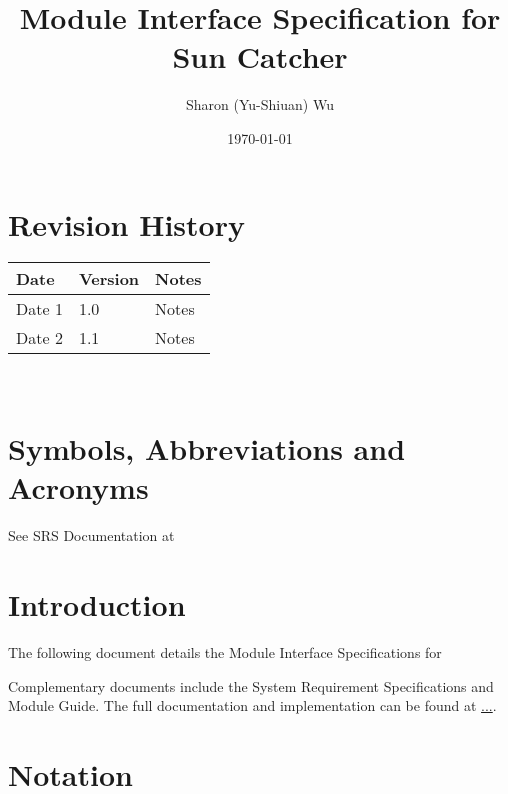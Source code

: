 \documentclass[12pt, titlepage]{article}
\newcommand{\progname}{Sun Catcher}
\begin{document}
\title{Module Interface Specification for \progname}

\author{Sharon (Yu-Shiuan) Wu}

\date{\today}

\maketitle


\section{Revision History}

\begin{tabularx}{\textwidth}{p{3cm}p{2cm}X}
\toprule {\bf Date} & {\bf Version} & {\bf Notes}\\
\midrule
Date 1 & 1.0 & Notes\\
Date 2 & 1.1 & Notes\\
\bottomrule
\end{tabularx}

~\newpage

\section{Symbols, Abbreviations and Acronyms}

See SRS Documentation at 


\newpage

\tableofcontents

\newpage


\section{Introduction}

The following document details the Module Interface Specifications for

Complementary documents include the System Requirement Specifications
and Module Guide.  The full documentation and implementation can be
found at \url{...}.  

\section{Notation}
\end{document}
